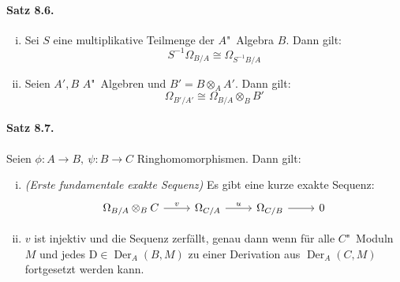 \documentclass[11pt,b5paper,openany]{memoir}
\begin{document}
\paragraph{Satz 8.6.}\label{8.6} \begin{enumerate}[(i)]
\item Sei $S$ eine multiplikative Teilmenge der $A$"~Algebra $B$. Dann gilt:
\[S^{-1}\Omega_{B/A}\cong\Omega_{S^{-1}B/A} \]
\item Seien $A',B$ $A$"~Algebren und $B'=B\otimes_AA'$. Dann gilt:
\[\Omega_{B'/A'}\cong\Omega_{B/A}\otimes_BB' \]
\end{enumerate}

\paragraph{Satz 8.7.}\label{8.7} Seien $\phi:A\to B,\ \psi:B\to C$ Ringhomomorphismen. Dann gilt:
\begin{enumerate}[(i)]
\item \textit{(Erste fundamentale exakte Sequenz)} Es gibt eine kurze exakte Sequenz:
\[\begin{tikzcd}
\Omega_{B/A}\otimes_BC \ar[r, "v"] & \Omega_{C/A} \ar[r, "u"] & \Omega_{C/B}\rar & 0
\end{tikzcd} \]
\item $v$ ist injektiv und die Sequenz zerfällt, genau dann wenn für alle $C$"~Moduln $M$ und jedes $\mathrm{D}\in \operatorname{Der}_A(B,M)$ zu einer Derivation aus $\operatorname{Der}_A(C,M)$ fortgesetzt werden kann.
\end{enumerate}

\printindex
\end{document}
